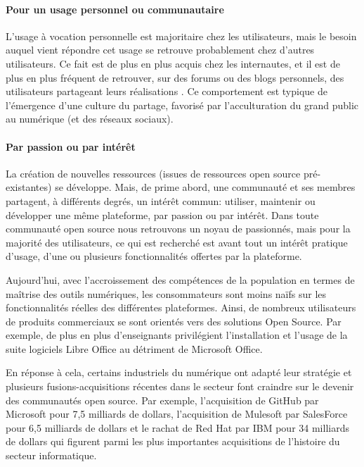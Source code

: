             \paragraph{Pour un usage personnel ou communautaire}
                L'usage à vocation personnelle est majoritaire chez les utilisateurs, mais le besoin auquel vient répondre cet usage se retrouve probablement chez d'autres utilisateurs. Ce fait est de plus en plus acquis chez les internautes, et il est de plus en plus fréquent de retrouver, sur des forums ou des blogs personnels, des utilisateurs partageant leurs réalisations . Ce comportement est typique de l'émergence d'une culture du partage, favorisé par l'acculturation du grand public au numérique (et des réseaux sociaux).
            \paragraph{Par passion ou par intérêt}
                La création de nouvelles ressources (issues de ressources open source pré-existantes) se développe.
                Mais, de prime abord, une communauté et ses membres partagent, à différents degrés, un intérêt commun: utiliser, maintenir ou développer une même plateforme, par passion ou par intérêt. Dans toute communauté open source nous retrouvons un noyau de passionnés, mais pour la majorité des utilisateurs, ce qui est recherché est avant tout un intérêt pratique d'usage, d'une ou plusieurs fonctionnalités offertes par la plateforme.\par%
                Aujourd'hui, avec l'accroissement des compétences de la population en termes de maîtrise des outils numériques, les consommateurs sont moins naïfs sur les fonctionnalités réelles des différentes plateformes.
                Ainsi, de nombreux utilisateurs de produits commerciaux se sont orientés vers des solutions Open Source. Par exemple, de plus en plus d'enseignants privilégient l'installation et l'usage de la suite logiciels Libre Office au détriment de Microsoft Office.\par%
                En réponse à cela, certains industriels du numérique ont adapté leur stratégie et plusieurs fusions-acquisitions récentes dans le secteur font craindre sur le devenir des communautés open source. Par exemple, l'acquisition de GitHub par Microsoft pour 7,5 milliards de dollars, l’acquisition de Mulesoft par SalesForce pour 6,5 milliards de dollars et le rachat de Red Hat par IBM pour 34 milliards de dollars qui figurent parmi les plus importantes acquisitions de l'histoire du secteur informatique.
